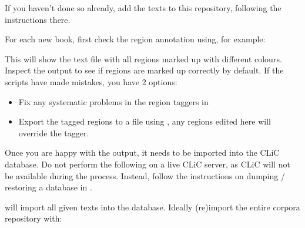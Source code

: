 \documentclass[letterpaper,10pt,english]{sphinxmanual}
\begin{document}
\sphinxAtStartPar
If you haven’t done so already, add the texts to this repository,
following the instructions there.

\sphinxAtStartPar
For each new book, first check the region annotation using, for
example:

\begin{sphinxVerbatim}[commandchars=\\\{\}]
 
\end{sphinxVerbatim}

\sphinxAtStartPar
This will show the text file with all regions marked up with different
colours. Inspect the output to see if regions are marked up correctly by
default. If the scripts have made mistakes, you have 2 options:
\begin{itemize}
\item {} 
\sphinxAtStartPar
Fix any systematic problems in the region taggers in

\item {} 
\sphinxAtStartPar
Export the tagged regions to a  file using
, any regions edited here will override
the tagger.

\end{itemize}

\sphinxAtStartPar
Once you are happy with the output, it needs to be imported into the
CLiC database. Do not perform the following on a live CLiC server, as
CLiC will not be available during the process. Instead, follow the
instructions on dumping / restoring a database in
{\hyperref[\detokenize{advanced/production:managing-a-production-instance-of-clic}]{}}.

\sphinxAtStartPar
{} will import all given texts into the database.
Ideally (re\sphinxhyphen{})import the entire corpora repository with:

\begin{sphinxVerbatim}[commandchars=\\\{\}]
 
\end{sphinxVerbatim}
\end{document}
